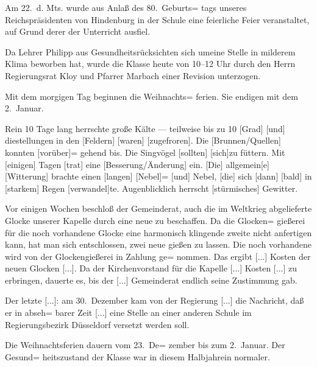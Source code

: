 

%
Am 22.\ d. Mts. wurde aus Anlaß des 80.\ Geburts=\ob
tags unseres Reichspräsidenten von Hindenburg in\ob
der Schule eine feierliche Feier veranstaltet, auf Grund\ob
derer der Unterricht ausfiel.

Da Lehrer Philipp aus Gesundheitsrücksichten sich um\ob
[...] eine Stelle in milderem Klima beworben hat,\ob
wurde die Klasse heute von 10–12 Uhr durch den Herrn\ob
Regierungsrat\unsicher{} Kloy und Pfarrer Marbach\ob
einer Revision unterzogen.

%
Mit dem morgigen Tag beginnen die Weihnachts=\ob
ferien. Sie endigen mit dem 2.\ Januar.

Rein 10 Tage lang herrschte große Kälte — teilweise\ob
bis zu 10 {[Grad]}\unsicher{} {[und]} die\unsicher{}stellungen in den\ob
{[Feldern]} {[waren]} {[zugefroren]}. Die [Brunnen/Quellen] konnten {[vorüber]}=\ob
gehend\unsicher{} bis\unsicher{}. Die Singvögel {[sollten]}\unsicher\ob
{[sich]}\unsicher{}\unsicher zu füttern\unsicher. Mit {[einigen]} Tagen {[trat]}\unsicher{} eine [Besserung/Änderung]\ob
ein. {[Die]} allgemein{[e]} {[Witterung]} brachte\unsicher{} einen {[langen]} {[Nebel]}=\ob
{[und]}\unsicher{} Nebel, {[die]} sich {[dann]} {[bald]} in {[starkem]}\ob
Regen {[verwandel]}te. Augenblicklich herrscht\unsicher{} {[stürmisches]}\ob
Gewitter.

Vor einigen Wochen beschloß der Gemeinderat,\ob
auch die im Weltkrieg abgelieferte Glocke unserer\ob
Kapelle durch eine neue zu beschaffen. Da die Glocken=\ob
gießerei für die noch vorhandene Glocke eine harmonisch\ob
klingende zweite nicht anfertigen kann, hat man\ob
sich entschlossen, zwei neue gießen zu lassen. Die noch\ob
vorhandene wird von der Glockengießerei in Zahlung ge=\ob
nommen. Das ergibt [...] Kosten der neuen\ob
Glocken [...]. Da der Kirchenvorstand für\ob
die Kapelle [...] Kosten [...] zu erbringen,\ob
dauerte es, bis der [...] Gemeinderat\ob
endlich seine Zustimmung gab.

Der letzte [...]: am 30.\ Dezember kam von\ob
der Regierung [...] die Nachricht, daß er in abseh=\ob
barer Zeit [...] eine Stelle an einer anderen Schule im\ob
Regierungsbezirk Düsseldorf versetzt werden soll.

Die Weihnachtsferien dauern vom 23.\ De=\ob
zember bis zum 2.\ Januar. Der Gesund=\ob
heitszustand der Klasse war in diesem Halbjahr\ob
[...] ein normaler.
\pend
